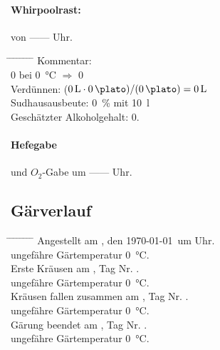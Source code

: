 \documentclass[12pt,oneside,a4paper]{scrartcl}
\begin{document}
{\paragraph{Whirpoolrast:} von ------ Uhr.
	\begin{tabbing}
		\hspace{1cm} \= \hspace{1cm} \= \hspace{1cm} \= \hspace{1cm} \= \hspace{1cm} \= \hspace{1cm} \= \hspace{1cm} \= \hspace{1cm} \= \kill
		\> Kommentar: \>\>\> \\
		\> \> \> \SI{0}{\plato} \> bei \> \SI{0}{\degreeCelsius} \> $\Rightarrow$ \> \SI{0}{\plato}\\
		\> \> Verdünnen: \> \> \> \> \> ($\SI{0}{\litre} \cdot \SI{0}{\plato})/(\SI{0}{\plato})= \SI{0}{\litre}$\\
		\> \> Sudhausausbeute: \> \> \> \> \> \SI{0}{\percent} mit \SI{10}{\litre}\\
		\> \> Geschätzter Alkoholgehalt: \> \> \> \> \> \SI{0}{\pervol}.
	\end{tabbing}
%
\paragraph{Hefegabe} und $O_2$-Gabe um ------ Uhr.
%
\subsection*{Gärverlauf}
	\begin{tabbing}
		\hspace{1cm} \= \hspace{1cm} \= \hspace{1cm} \= \hspace{1cm} \= \hspace{1cm} \= \hspace{1cm} \= \hspace{1cm} \= \hspace{1cm} \= \kill
		\> Angestellt am , den \today \ um  Uhr.\\
		\> \> ungefähre Gärtemperatur \SI{0}{\degreeCelsius}.\\
		\> Erste Kräusen am \hspace{4cm}, Tag Nr.\hspace{2.5cm} .\\
		\> \> ungefähre Gärtemperatur \SI{0}{\degreeCelsius}.\\
		\> Kräusen fallen zusammen am \hspace{4cm}, Tag Nr. \hspace{2.5cm}.\\
		\> \> ungefähre Gärtemperatur \SI{0}{\degreeCelsius}.\\
		\> Gärung beendet am \hspace{4cm}, Tag Nr. \hspace{2.5cm}.\\
		\> \> ungefähre Gärtemperatur \SI{0}{\degreeCelsius}.
	\end{tabbing}
%
}
\end{document}

